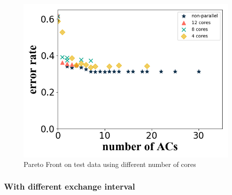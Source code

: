 \documentclass[conference]{IEEEtran}
\begin{document}
\begin{figure}[H]
    \begin{minipage}[t]{0.25\textwidth}
    \includegraphics[width=0.98\textwidth]{figures/diffCoreTest3.png}
    \end{minipage}
    \caption{Pareto Front on test data using different number of cores}
    \label{diffCoreT}
  \end{figure}
  
  
  
  \subsubsection{With different exchange interval}
 
\end{document}
